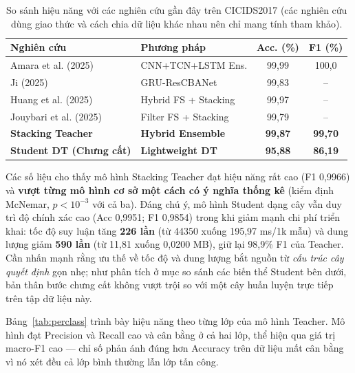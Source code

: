 \begin{table}[!t]
\centering
\caption{So sánh hiệu năng với các nghiên cứu gần đây trên CICIDS2017 (các nghiên cứu dùng giao thức và cách chia dữ liệu khác nhau nên chỉ mang tính tham khảo).}
\label{tab:literature_comparison}
\footnotesize
\begin{tabularx}{\columnwidth}{@{}>{\raggedright\arraybackslash}p{2.3cm}Xcc@{}}
\toprule
\textbf{Nghiên cứu} & \textbf{Phương pháp} & \textbf{Acc. (\%)} & \textbf{F1 (\%)} \\
\midrule
Amara et al. (2025)~\cite{amara2025stacked}     & CNN+TCN+LSTM Ens.     & 99,99 & 100,0 \\
Ji (2025)~\cite{ji2025hybrid}                   & GRU-ResCBANet         & 99,83 & --    \\
Huang et al. (2025)~\cite{huang2025stacking}    & Hybrid FS + Stacking  & 99,97 & --    \\
Jouybari et al. (2025)~\cite{jouybari2025stacking} & Filter FS + Stacking  & 99,79 & --    \\
\midrule
\textbf{Stacking Teacher}                     & \textbf{Hybrid Ensemble} & \textbf{99,87} & \textbf{99,70} \\
\textbf{Student DT (Chưng cất)}               & \textbf{Lightweight DT}  & \textbf{95,88} & \textbf{86,19} \\
\bottomrule
\end{tabularx}
\end{table}

Các số liệu cho thấy mô hình Stacking Teacher đạt hiệu năng rất cao (F1 0,9966) và \textbf{vượt từng mô hình cơ sở một cách có ý nghĩa thống kê} (kiểm định McNemar, $p < 10^{-3}$ với cả ba). Đáng chú ý, mô hình Student dạng cây vẫn duy trì độ chính xác cao (Acc 0,9951; F1 0,9854) trong khi giảm mạnh chi phí triển khai: tốc độ suy luận tăng \textbf{226 lần} (từ 44350 xuống 195,97 ms/1k mẫu) và dung lượng giảm \textbf{590 lần} (từ 11,81 xuống 0,0200 MB), giữ lại 98,9\% F1 của Teacher. Cần nhấn mạnh rằng ưu thế về tốc độ và dung lượng bắt nguồn từ \emph{cấu trúc cây quyết định} gọn nhẹ; như phân tích ở mục so sánh các biến thể Student bên dưới, bản thân bước chưng cất không vượt trội so với một cây huấn luyện trực tiếp trên tập dữ liệu này.

Bảng~\ref{tab:perclass} trình bày hiệu năng theo từng lớp của mô hình Teacher. Mô hình đạt Precision và Recall cao và cân bằng ở cả hai lớp, thể hiện qua giá trị macro-F1 cao --- chỉ số phản ánh đúng hơn Accuracy trên dữ liệu mất cân bằng vì nó xét đều cả lớp bình thường lẫn lớp tấn công.

